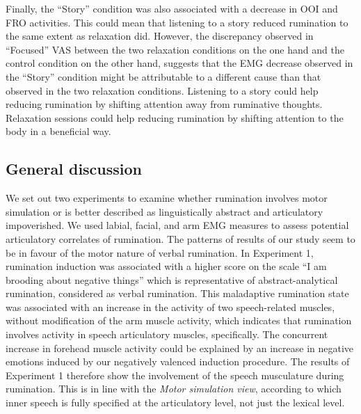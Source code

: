 \documentclass[a4paper,12pt,twoside,openright,oldfontcommands,final]{memoir}
\begin{document}
Finally, the \enquote{Story} condition was also associated with a decrease in OOI and FRO activities. This could mean that listening to a story reduced rumination to the same extent as relaxation did. However, the discrepancy observed in \enquote{Focused} VAS between the two relaxation conditions on the one hand and the control condition on the other hand, suggests that the EMG decrease observed in the \enquote{Story} condition might be attributable to a different cause than that observed in the two relaxation conditions. Listening to a story could help reducing rumination by shifting attention away from ruminative thoughts. Relaxation sessions could help reducing rumination by shifting attention to the body in a beneficial way.

\hypertarget{general-discussion}{%
\subsection{General discussion}\label{general-discussion}}

We set out two experiments to examine whether rumination involves motor simulation or is better described as linguistically abstract and articulatory impoverished. We used labial, facial, and arm EMG measures to assess potential articulatory correlates of rumination. The patterns of results of our study seem to be in favour of the motor nature of verbal rumination. In Experiment 1, rumination induction was associated with a higher score on the scale \enquote{I am brooding about negative things} which is representative of abstract-analytical rumination, considered as verbal rumination. This maladaptive rumination state was associated with an increase in the activity of two speech-related muscles, without modification of the arm muscle activity, which indicates that rumination involves activity in speech articulatory muscles, specifically. The concurrent increase in forehead muscle activity could be explained by an increase in negative emotions induced by our negatively valenced induction procedure. The results of Experiment 1 therefore show the involvement of the speech musculature during rumination. This is in line with the \emph{Motor simulation view}, according to which inner speech is fully specified at the articulatory level, not just the lexical level.
\end{document}
